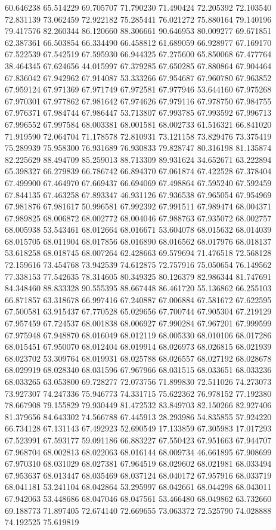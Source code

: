 60.646238
65.514229
69.705707
71.790230
71.490424
72.205392
72.103540
72.831139
73.062459
72.922182
75.285441
76.021272
75.880164
79.140196
79.417576
82.260344
86.120660
88.306661
90.646953
80.009277
69.671851
62.387361
66.503854
66.334490
66.458812
61.689059
66.928977
67.169170
67.522539
67.542519
67.595930
66.944325
67.275600
65.850068
67.477764
38.464345
67.624656
44.015997
67.379285
67.650285
67.880864
67.904464
67.836042
67.942962
67.914087
53.333266
67.954687
67.960780
67.963852
67.959124
67.971369
67.971749
67.972581
67.977946
53.644160
67.975268
67.970301
67.977862
67.981642
67.974626
67.979116
67.978750
67.984755
67.976371
67.984744
67.986447
53.713807
67.993785
67.993592
67.996713
67.996552
67.997584
68.003381
68.001581
68.002733
61.516321
66.841020
71.919590
72.064704
71.178578
72.810931
73.121158
73.829476
73.375419
75.289939
75.958300
76.931689
76.930833
79.828747
80.316198
81.135874
82.225629
88.494709
85.259013
88.713309
89.931624
34.652671
63.222894
65.398327
66.279839
66.786742
66.894370
67.061874
67.422528
67.378404
67.499900
67.464970
67.669437
66.694069
67.498864
67.595240
67.592459
67.844135
67.463258
67.893347
46.931126
67.936538
67.965054
67.954969
67.981876
67.981617
50.996581
67.992392
67.991511
67.989474
68.004371
67.989825
68.006872
68.002772
68.004046
67.988763
67.935072
68.002757
68.005938
53.543461
68.012664
68.016671
53.604078
68.015632
68.014039
68.015705
68.011904
68.017856
68.016890
68.016562
68.017976
68.018137
53.618258
68.018745
68.007264
62.428663
69.579694
71.476518
72.568128
72.159616
73.454768
73.942539
74.612875
72.757916
75.050654
76.149562
77.338153
77.542635
78.314605
80.349325
80.126379
82.986344
81.747691
84.348460
88.833328
90.555395
88.667448
86.461720
55.136862
66.255103
66.871857
63.318678
66.997416
67.240887
67.006884
67.581672
67.622595
67.500581
63.915437
67.770528
65.029656
67.700744
67.905304
67.219129
67.957459
67.724537
68.001838
68.006927
67.990284
67.967201
67.999599
67.975948
67.948870
68.016049
68.012119
68.005330
68.010106
68.017286
68.015451
67.950070
68.012404
68.019914
68.026973
68.026815
68.021939
68.023702
53.309764
68.019931
68.025788
68.026557
68.027192
68.028678
68.029919
68.028340
68.031596
67.967966
68.031515
68.033651
68.033236
68.033265
63.053800
69.728277
72.073756
71.899830
72.511026
74.273073
73.927307
74.247336
75.946773
74.331715
75.622362
76.978152
77.192380
78.667908
79.155829
79.930449
81.472532
83.849703
82.150266
82.927406
81.379656
84.643302
74.566788
67.445913
28.293986
54.835855
57.924220
66.734128
67.131143
67.492923
52.690549
17.133859
67.305983
17.017293
67.523991
67.593177
59.091186
66.883227
67.550423
67.951663
67.944707
67.968704
68.002813
68.022063
68.016144
68.009734
46.661895
67.908699
67.970310
68.031029
68.027381
67.964519
68.029602
68.021981
68.033494
67.953637
68.013447
68.035469
68.037124
68.040172
67.957916
68.033719
68.041181
53.241104
68.042864
53.295997
68.042661
68.044298
68.043011
67.942063
53.448686
68.047046
68.047561
53.466480
68.049862
63.732660
69.188773
71.897405
72.674140
72.669655
73.063372
72.525790
74.028888
74.192525
75.619819

